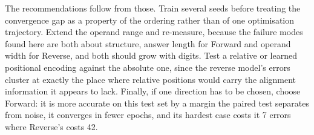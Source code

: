\documentclass[10pt,a4paper,twocolumn]{article}
\begin{document}
The recommendations follow from those. Train several seeds before treating the convergence gap as
a property of the ordering rather than of one optimisation trajectory. Extend the operand range
and re-measure, because the failure modes found here are both about structure, answer length for
Forward and operand width for Reverse, and both should grow with digits. Test a relative or
learned positional encoding against the absolute one, since the reverse model's errors cluster at
exactly the place where relative positions would carry the alignment information it appears to
lack. Finally, if one direction has to be chosen, choose Forward: it is more accurate on this test set by a margin the paired test separates from noise, it converges in fewer epochs, and its hardest case costs it 7 errors where Reverse's costs 42.
\end{document}
